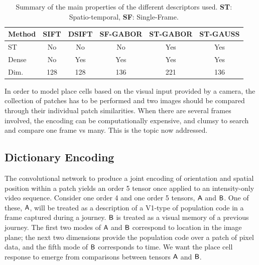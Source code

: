 \begin{table}
\centering
   \begin{tabular}{lccccc}
    Method          & SIFT & DSIFT & SF-GABOR & ST-GABOR & ST-GAUSS \\ \hline
    ST			   & No   & No    & No       & Yes      & Yes      \\ \hline
    Dense           & No   & Yes   & Yes      & Yes      & Yes      \\ \hline
    Dim.       & 128  & 128   & 136      & 221      & 136      \\
    \end{tabular}
\caption{Summary of the main properties of the different descriptors used. \textbf{ST}: Spatio-temporal, \textbf{SF}: Single-Frame.}
\label{tab:methods}

\end{table}



In order to model place cells based on the visual input provided by a camera, the collection of patches has to be performed and two images should be compared through their individual patch similarities. When there are several frames involved, the encoding can be computationally expensive, and clumsy to search and compare one frame vs many.  This is the topic now addressed.

\subsection{Dictionary Encoding}
The convolutional network to produce a joint encoding of orientation and spatial position within a patch yields an order 5 tensor once applied to an intensity-only video sequence.  Consider one order 4 and one order 5 tensors, $\mathsf{A}$ and $\mathsf{B}$. One of these, $\mathsf{A}$, will be treated as a description of a V1-type of population code in a frame captured during a journey. $\mathsf{B}$ is treated as a visual memory of a previous journey. The first two modes of $\mathsf{A}$ and $\mathsf{B}$ correspond to location in the image plane; the next two dimensions provide the population code over a patch of pixel data, and the fifth mode of $\mathsf{B}$ corresponds to time. We want the place cell response to emerge from comparisons between tensors $\mathsf{A}$ and $\mathsf{B}$.

